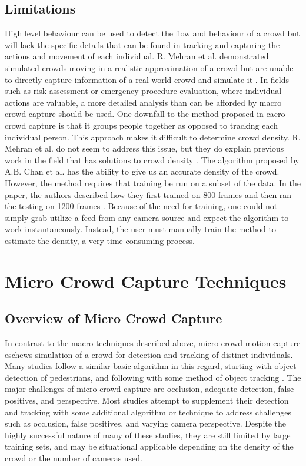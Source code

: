 \documentclass[12pt, onecolumn, conference]{IEEEtran}
\begin{document}
\subsection{Limitations}

High level behaviour can be used to detect the flow and behaviour of a crowd but will lack the specific details that can be found in tracking and capturing the actions and movement of each individual. R. Mehran et al. demonstrated simulated crowds moving in a realistic approximation of a crowd but are unable to directly capture information of a real world crowd and simulate it \cite{R. Mehran}. 
In fields such as risk assessment or emergency procedure evaluation, where individual actions are valuable, a more detailed analysis than can be afforded by macro crowd capture should be used.
One downfall to the method proposed in cacro crowd capture is that it groups people together as opposed to tracking each individual person. This approach makes it difficult to determine crowd density. R. Mehran et al. do not seem to address this issue, but they do explain previous work in the field that has solutions to crowd density \cite{N. Courty}\cite{R. Mehran}\cite{S. Saxena}. 
The algorithm proposed by A.B. Chan et al. has the ability to give us an accurate density of the crowd. However, the method requires that training be run on a subset of the data. In the paper, the authors described how they first trained on 800 frames and then ran the testing on 1200 frames \cite{A.B. Chan}. Because of the need for training, one could not simply grab utilize a feed from any camera source and expect the algorithm to work instantaneously. Instead, the user must manually train the method to estimate the density, a very time consuming process.

\section{Micro Crowd Capture Techniques}

\subsection{Overview of Micro Crowd Capture}

In contrast to the macro techniques described above, micro crowd motion capture eschews simulation of a crowd for detection and tracking of distinct individuals. Many studies follow a similar basic algorithm in this regard, starting with object detection of pedestrians, and following with some method of object tracking \cite{M. Rodriguez}\cite{D. Zhang}\cite{I. Ali}\cite{F. Zhao}\cite{I. Ali2}. The major challenges of micro crowd capture are occlusion, adequate detection, false positives, and perspective. Most studies attempt to supplement their detection and tracking with some additional algorithm or technique to address challenges such as occlusion, false positives, and varying camera perspective. 
Despite the highly successful nature of many of these studies, they are still limited by large training sets, and may be situational applicable depending on the density of the crowd or the number of cameras used.
\end{document}
